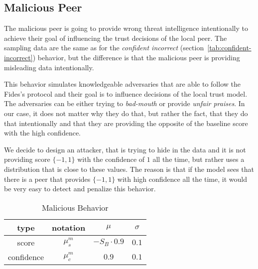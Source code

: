 \subsection{Malicious Peer}
\label{subsubsec:malicious-peer}
The malicious peer is going to provide wrong threat intelligence intentionally to achieve their goal of influencing the trust decisions of the local peer. 
The sampling data are the same as for the \textit{confident incorrect} (section~\ref{tab:confident-incorrect}) behavior, but the difference is that the malicious peer is providing misleading data intentionally.

This behavior simulates knowledgeable adversaries that are able to follow the Fides's protocol and their goal is to influence decisions of the local trust model.
The adversaries can be either trying to \textit{bad-mouth} or provide \textit{unfair praises}.
In our case, it does not matter why they do that, but rather the fact, that they do that intentionally and that they are providing the opposite of the baseline score with the high confidence.

We decide to design an attacker, that is trying to hide in the data and it is not providing score $\{-1, 1\}$ with the confidence of $1$ all the time, but rather uses a distribution that is close to these values.
The reason is that if the model sees that there is a peer that provides $\{-1, 1\}$ with high confidence all the time, it would be very easy to detect and penalize this behavior.

\begin{table}[!ht]
    \centering
    \begin{tabular}{c|c|c|c}
        type & notation & $\mu$ & $\sigma$ \\
        \hline
        score & $\mu^{m}_{s}$ & $-S_{B} \cdot 0.9$ & $0.1$ \\
        confidence & $\mu^{m}_{c}$ &  $0.9$ & $0.1$ \\
    \end{tabular}
    \caption{Malicious Behavior}
    \label{tab:malicious-peer}
\end{table}

